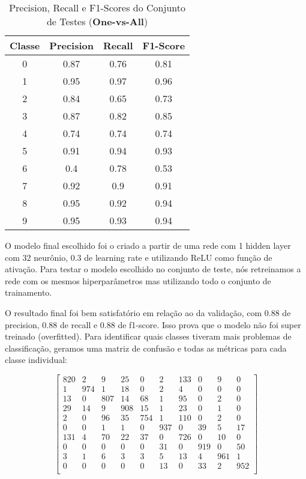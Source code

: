 \documentclass[conference]{IEEEtran}
\begin{document}
\begin{table}[h!]
 \begin{center}
  \caption{Precision, Recall e F1-Scores do Conjunto de Testes (\textbf{One-vs-All})}
  \label{table:table3}
  \begin{tabular}{ |c|c|c|c| }
   \hline
   Classe & Precision & Recall & F1-Score\\
   \hline
   0 & 0.87 & 0.76 & 0.81 \\
   1 & 0.95 & 0.97 & 0.96 \\
   2 & 0.84 & 0.65 & 0.73 \\
   3 & 0.87 & 0.82 & 0.85 \\
   4 & 0.74 & 0.74 & 0.74 \\
   5 & 0.91 & 0.94 & 0.93 \\
   6 & 0.4 & 0.78 & 0.53 \\
   7 & 0.92 & 0.9 & 0.91 \\
   8 & 0.95 & 0.92 & 0.94 \\
   9 & 0.95 & 0.93 & 0.94 \\
   \hline
 \end{tabular}
 \end{center}
\end{table}



	O modelo final escolhido foi o criado a partir de uma rede com 1 hidden layer com 32 neurônio, 0.3 de learning rate e utilizando ReLU como função de ativação.	Para testar o modelo escolhido no conjunto de teste, nós retreinamos a rede com os mesmos hiperparâmetros mas utilizando todo o conjunto de trainamento. 
	
	O resultado final foi bem satisfatório em relação ao da validação, com $0.88$ de precision, $0.88$ de recall e $0.88$ de f1-score. Isso prova que o modelo não foi super treinado (overfitted). Para identificar quais classes tiveram mais problemas de classificação, geramos uma matriz de confusão e todas as métricas para cada classe individual:
	
	
	
\[
\begin{bmatrix}
    820 & 2   & 9   & 25  & 0   & 2   & 133 & 0   & 9   & 0 \\
    1   & 974 & 1   & 18  & 0   & 2   & 4   & 0   & 0   & 0 \\
    13  & 0   & 807 & 14  & 68  & 1   & 95  & 0   & 2   & 0 \\
    29  & 14  & 9   & 908 & 15  & 1   & 23  & 0   & 1   & 0 \\
    2   & 0   & 96  & 35  & 754 & 1   & 110 & 0   & 2   & 0 \\
    0   & 0   & 1   & 1   & 0   & 937 &  0  & 39  & 5   & 17 \\
    131 & 4   & 70  & 22  & 37  & 0   & 726 & 0   & 10  & 0 \\
    0   & 0   & 0   & 0   & 0   & 31  & 0   & 919 & 0   & 50 \\
    3   & 1   & 6   & 3   & 3   & 5   & 13  & 4   & 961 & 1  \\
    0   & 0   & 0   & 0   & 0   & 13  & 0   & 33  & 2   & 952 \\
\end{bmatrix}
\]
\end{document}
